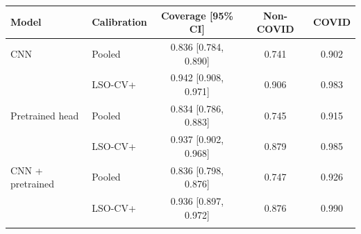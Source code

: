 \begin{tabular}{llccc}
\toprule
Model & Calibration & Coverage [95\% CI] & Non-COVID & COVID \\
\midrule
CNN & Pooled & 0.836 [0.784, 0.890] & 0.741 & 0.902 \\
 & LSO-CV+ & 0.942 [0.908, 0.971] & 0.906 & 0.983 \\\addlinespace
Pretrained head & Pooled & 0.834 [0.786, 0.883] & 0.745 & 0.915 \\
 & LSO-CV+ & 0.937 [0.902, 0.968] & 0.879 & 0.985 \\\addlinespace
CNN + pretrained & Pooled & 0.836 [0.798, 0.876] & 0.747 & 0.926 \\
 & LSO-CV+ & 0.936 [0.897, 0.972] & 0.876 & 0.990 \\\addlinespace
\bottomrule
\end{tabular}